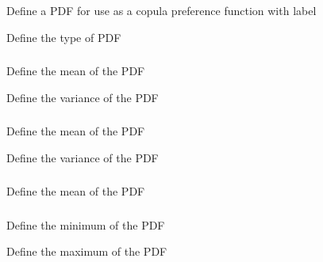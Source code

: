  {Define a PDF for use as a copula preference function with label}

 {Define the type of PDF}

\subsubsection[Normal]{}

 {Define the mean of the PDF}

 {Define the variance of the PDF}

\subsubsection[Lognormal]{}

 {Define the mean of the PDF}

 {Define the variance of the PDF}

\subsubsection[Exponential]{}

 {Define the mean of the PDF}

\subsubsection[Uniform]{}

 {Define the minimum of the PDF}

 {Define the maximum of the PDF}

\subsection{}

